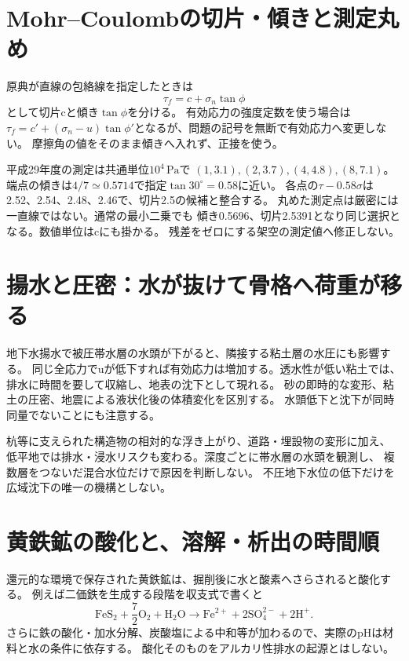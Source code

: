 \section{Mohr--Coulombの切片・傾きと測定丸め}\label{theory:engineering:mohr}
原典が直線の包絡線を指定したときは
\[
 \tau_f=c+\sigma_n\tan\phi
\]
として切片cと傾き\(\tan\phi\)を分ける。
有効応力の強度定数を使う場合は
\(\tau_f=c'+(\sigma_n-u)\tan\phi'\)となるが、問題の記号を無断で有効応力へ変更しない。
摩擦角の値をそのまま傾きへ入れず、正接を使う。\cite{eng52_mohr_ref}

平成29年度の測定は共通単位\(10^4\,\mathrm{Pa}\)で
\((1,3.1),(2,3.7),(4,4.8),(8,7.1)\)。
端点の傾きは\(4/7\simeq0.5714\)で指定\(\tan30^\circ=0.58\)に近い。
各点の\(\tau-0.58\sigma\)は2.52、2.54、2.48、2.46で、切片2.5の候補と整合する。
丸めた測定点は厳密には一直線ではない。通常の最小二乗でも
傾き0.5696、切片2.5391となり同じ選択となる。数値単位はcにも掛かる。
残差をゼロにする架空の測定値へ修正しない。

\section{揚水と圧密：水が抜けて骨格へ荷重が移る}\label{theory:engineering:consolidation}
地下水揚水で被圧帯水層の水頭が下がると、隣接する粘土層の水圧にも影響する。
同じ全応力でuが低下すれば有効応力は増加する。透水性が低い粘土では、
排水に時間を要して収縮し、地表の沈下として現れる。\cite{eng52_consolidation,eng52_subsidence_ref}
砂の即時的な変形、粘土の圧密、地震による液状化後の体積変化を区別する。
水頭低下と沈下が同時同量でないことにも注意する。

杭等に支えられた構造物の相対的な浮き上がり、道路・埋設物の変形に加え、
低平地では排水・浸水リスクも変わる。深度ごとに帯水層の水頭を観測し、
複数層をつないだ混合水位だけで原因を判断しない。
不圧地下水位の低下だけを広域沈下の唯一の機構としない。

\section{黄鉄鉱の酸化と、溶解・析出の時間順}\label{theory:engineering:pyrite}
還元的な環境で保存された黄鉄鉱は、掘削後に水と酸素へさらされると酸化する。
例えば二価鉄を生成する段階を収支式で書くと
\[
 \mathrm{FeS_2}+\frac72\mathrm{O_2}+\mathrm{H_2O}
 \longrightarrow \mathrm{Fe^{2+}}+2\mathrm{SO_4^{2-}}+2\mathrm{H^+}.
\]
さらに鉄の酸化・加水分解、炭酸塩による中和等が加わるので、実際のpHは材料と水の条件に依存する。
酸化そのものをアルカリ性排水の起源とはしない。\cite{eng52_weathering}

